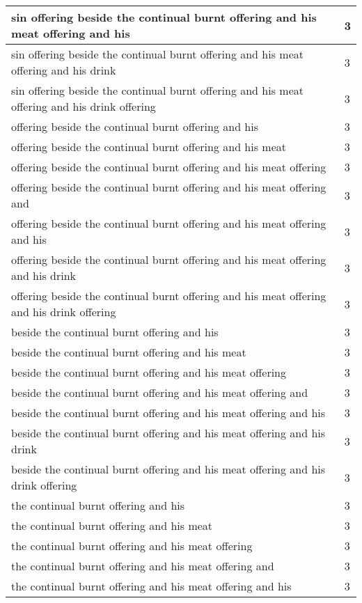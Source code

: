 \begin{center}
\begin{longtable}{|p{3.0in}|p{0.5in}|}
sin offering beside the continual burnt offering and his meat offering and his & 3\\ \hline 
sin offering beside the continual burnt offering and his meat offering and his drink & 3\\ \hline 
sin offering beside the continual burnt offering and his meat offering and his drink offering & 3\\ \hline 
offering beside the continual burnt offering and his & 3\\ \hline 
offering beside the continual burnt offering and his meat & 3\\ \hline 
offering beside the continual burnt offering and his meat offering & 3\\ \hline 
offering beside the continual burnt offering and his meat offering and & 3\\ \hline 
offering beside the continual burnt offering and his meat offering and his & 3\\ \hline 
offering beside the continual burnt offering and his meat offering and his drink & 3\\ \hline 
offering beside the continual burnt offering and his meat offering and his drink offering & 3\\ \hline 
beside the continual burnt offering and his & 3\\ \hline 
beside the continual burnt offering and his meat & 3\\ \hline 
beside the continual burnt offering and his meat offering & 3\\ \hline 
beside the continual burnt offering and his meat offering and & 3\\ \hline 
beside the continual burnt offering and his meat offering and his & 3\\ \hline 
beside the continual burnt offering and his meat offering and his drink & 3\\ \hline 
beside the continual burnt offering and his meat offering and his drink offering & 3\\ \hline 
the continual burnt offering and his & 3\\ \hline 
the continual burnt offering and his meat & 3\\ \hline 
the continual burnt offering and his meat offering & 3\\ \hline 
the continual burnt offering and his meat offering and & 3\\ \hline 
the continual burnt offering and his meat offering and his & 3\\ \hline 

\end{longtable}
\end{center}
